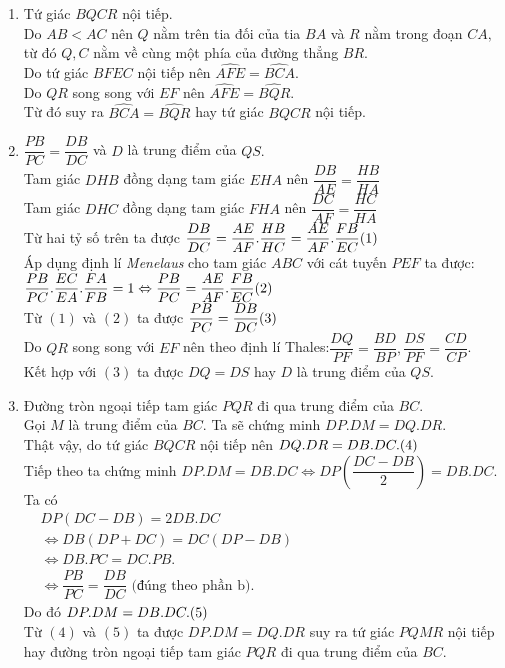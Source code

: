 \begin{bt}
{\begin{center}
		\end{center}
		\begin{enumerate}
			\item Tứ giác $BQCR$ nội tiếp.\\
			Do $AB<AC$ nên $Q$ nằm trên tia đối của tia $BA$ và $R$ nằm trong đoạn $CA,$ từ đó $Q, C$ nằm về cùng một phía của đường thẳng $BR.$\\
			Do tứ giác $BFEC$ nội tiếp nên $\widehat{AFE}=\widehat{BCA}$.\\
			Do $QR$ song song với $EF$ nên $\widehat{AFE}=\widehat{BQR}.$\\
			Từ đó suy ra $\widehat{BCA}=\widehat{BQR}$ hay tứ giác $BQCR$ nội tiếp.
			\item 
			$\dfrac{PB}{PC}=\dfrac{DB}{DC}$ và $D$ là trung điểm của $QS.$\\
			Tam giác $DHB$ đồng dạng tam giác $EHA$ nên $\dfrac{DB}{AE}=\dfrac{HB}{HA}$\\
			Tam giác $DHC$ đồng dạng tam giác $FHA$ nên $\dfrac{DC}{AF}=\dfrac{HC}{HA}$\\
			Từ hai tỷ số trên ta được $\dfrac{DB}{DC}=\dfrac{AE}{AF}.\dfrac{HB}{HC}=\dfrac{AE}{AF}.\dfrac{FB}{EC} \hfill (1)$\\
			Áp dụng định lí \textit{Menelaus} cho tam giác $ABC$ với cát tuyến $PEF$ ta được:\\
			$\dfrac{PB}{PC}.\dfrac{EC}{EA}.\dfrac{FA}{FB}=1 \Leftrightarrow \dfrac{PB}{PC}=\dfrac{AE}{AF}.\dfrac{FB}{EC}\hfill (2)$\\
			Từ $(1)$ và $(2)$ ta được $\dfrac{PB}{PC}=\dfrac{DB}{DC} \hfill (3)$\\
			Do $QR$ song song với $EF$ nên theo định lí Thales:$\dfrac{DQ}{PF}=\dfrac{BD}{BP},\dfrac{DS}{PF}=\dfrac{CD}{CP}$.\\
			Kết hợp với $(3)$ ta được $DQ=DS$ hay $D$ là trung điểm của $QS.$
			\item Đường tròn ngoại tiếp tam giác $PQR$ đi qua trung điểm của $BC.$\\
			Gọi $M$ là trung điểm của $BC.$ Ta sẽ chứng minh $DP.DM=DQ.DR$.\\
			Thật vậy, do tứ giác $BQCR$ nội tiếp nên $DQ.DR=DB.DC. \hfill (4)$\\
			Tiếp theo ta chứng minh $DP.DM=DB.DC\Leftrightarrow DP\left(\dfrac{DC-DB}{2}\right)=DB.DC.$\\
			Ta có \\
			$\begin{aligned}
			&DP\left(DC-DB\right)=2DB.DC\\
			&\Leftrightarrow DB\left(DP+DC\right)=DC\left(DP-DB\right)\\ 
			&\Leftrightarrow DB.PC=DC.PB.\\
			&\Leftrightarrow \dfrac{PB}{PC}=\dfrac{DB}{DC} \text{ (đúng theo phần b)}.
			\end{aligned}$\\
			Do đó $DP.DM=DB.DC. \hfill (5) $\\
			Từ $(4)$ và $(5)$ ta được $DP.DM=DQ.DR$ suy ra tứ giác $PQMR$ nội tiếp hay đường tròn ngoại tiếp tam giác $PQR$ đi qua trung điểm của $BC.$
			

\end{enumerate}}
\end{bt}
